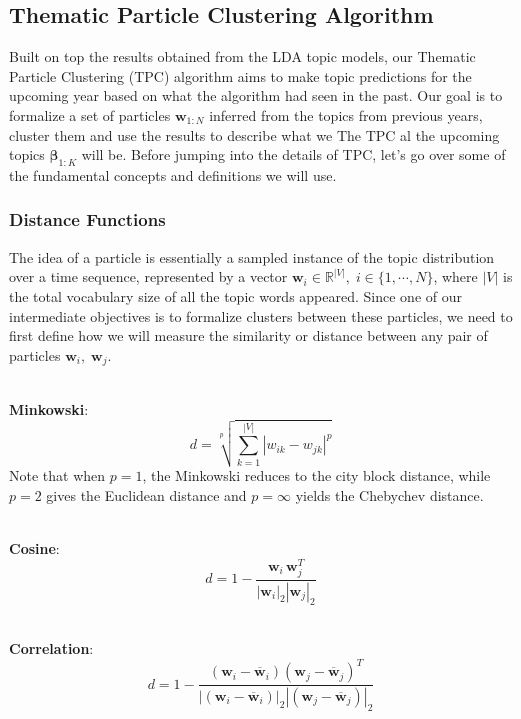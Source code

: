 \documentclass[conference]{IEEEtran}
\begin{document}
\subsection{Thematic Particle Clustering Algorithm}

Built on top the results obtained from the LDA topic models, our Thematic Particle Clustering (TPC) algorithm aims to make topic predictions for the upcoming year based on what the algorithm had seen in the past. Our goal is to formalize a set of particles $\mathbf{w}_{1:N}$ inferred from the topics from previous years, cluster them and use the results to describe what we The TPC al the upcoming topics $\mathbf{\beta}_{1:K}$ will be. Before jumping into the details of TPC, let's go over some of the fundamental concepts and definitions we will use.

\subsubsection{Distance Functions}
The idea of a particle is essentially a sampled instance of the topic distribution over a time sequence, represented by a vector $\mathbf{w}_i\in \mathbb{R}^{|V|},\; i \in \{1,\cdots,N\}$, where $|V|$ is the total vocabulary size of all the topic words appeared. Since one of our intermediate objectives is to formalize clusters between these particles, we need to first define how we will measure the similarity or distance between any pair of particles $\mathbf{w}_i,\; \mathbf{w}_j$. 

\-\\
\textbf{Minkowski}: 
\begin{equation*}
	d = \sqrt[p]{\sum_{k=1}^{|V|}|w_{ik} - w_{jk}|^p}
\end{equation*}
 Note that when $p=1$, the Minkowski reduces to the city block distance, while $p=2$ gives the Euclidean distance and $p=\infty$ yields the Chebychev distance.

\-\\
\textbf{Cosine}: 
\begin{equation*}
d = 1 - \frac{\mathbf{w}_i\,\mathbf{w}_j^T}{|\mathbf{w}_i|_2|\mathbf{w}_j|_2}
\end{equation*}

\-\\
\textbf{Correlation}: 
\begin{equation*}
d = 1 - \frac{(\mathbf{w}_i - \overline{\mathbf{w}}_i)(\mathbf{w}_j - \overline{\mathbf{w}}_j)^T}{|(\mathbf{w}_i - \overline{\mathbf{w}}_i)|_2|(\mathbf{w}_j - \overline{\mathbf{w}}_j)|_2}
\end{equation*}
\end{document}
